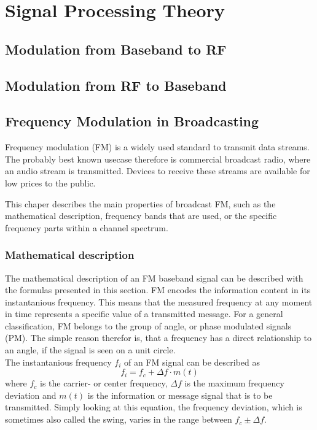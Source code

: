 \chapter{Signal Processing Theory}
\label{cha:TheThesis}

\section{Modulation from Baseband to RF}

\section{Modulation from RF to Baseband}

\section{Frequency Modulation in Broadcasting}

Frequency modulation (FM) is a widely used standard to transmit data streams.
The probably best known usecase therefore is commercial broadcast radio, where an audio stream is transmitted.
Devices to receive these streams are available for low prices to the public.

This chaper describes the main properties of broadcast FM, such as the mathematical description, frequency bands that are used, or the specific frequency parts within a channel spectrum.

\subsection{Mathematical description}

The mathematical description of an FM baseband signal can be described with the formulas presented in this section.
FM encodes the information content in its instantanious frequency.
This means that the measured frequency at any moment in time represents a specific value of a transmitted message.
For a general classification, FM belongs to the group of angle, or phase modulated signals (PM).
The simple reason therefor is, that a frequency has a direct relationship to an angle, if the signal is seen on a unit circle.\\

The instantanious frequency $f_i$ of an FM signal can be described as
\begin{equation}
  f_i = f_c + \Delta f \cdot m(t)
\end{equation}
where $f_c$ is the carrier- or center frequency, $\Delta f$ is the maximum frequency deviation and $m(t)$ is the information or message signal that is to be transmitted.
Simply looking at this equation, the frequency deviation, which is sometimes also called the swing, varies in the range between $f_c \pm \Delta f$.

